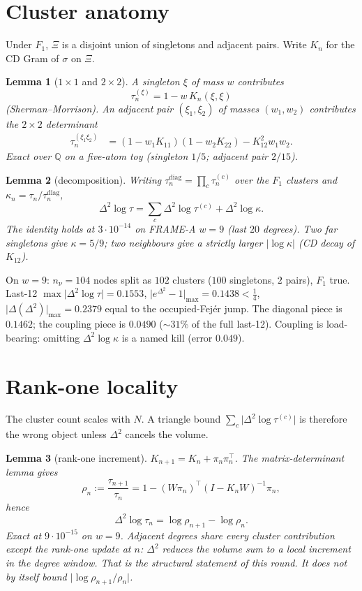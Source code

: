 \documentclass[11pt]{article}
\newtheorem{lemma}{Lemma}
\theoremstyle{remark}
\newcommand{\Q}{\mathbb{Q}}
\begin{document}
\section{Cluster anatomy}\label{sec:cluster}

Under $F_1$, $\Xi$ is a disjoint union of singletons and adjacent
pairs.  Write $K_n$ for the CD Gram of $\sigma$ on $\Xi$.

\begin{lemma}[$1\times1$ and $2\times2$]\label{lem:sm}
A singleton $\xi$ of mass $w$ contributes
\[
\tau_n^{(\xi)}=1-w\,K_n(\xi,\xi)
\]
(Sherman--Morrison).
An adjacent pair $(\xi_1,\xi_2)$ of masses $(w_1,w_2)$ contributes
the $2\times2$ determinant
\begin{align*}
\tau_n^{(\xi_1\xi_2)}
&=
(1-w_1 K_{11})(1-w_2 K_{22})-K_{12}^2 w_1 w_2.
\end{align*}
Exact over $\Q$ on a five-atom toy (singleton $1/5$; adjacent pair
$2/15$).
\end{lemma}

\begin{lemma}[decomposition]\label{lem:decomp}
Writing $\tau_n^{\mathrm{diag}}=\prod_c\tau_n^{(c)}$ over the
$F_1$ clusters and $\kappa_n=\tau_n/\tau_n^{\mathrm{diag}}$,
\[
\Delta^2\log\tau
=
\sum_c\Delta^2\log\tau^{(c)}
+
\Delta^2\log\kappa.
\]
The identity holds at $3\cdot10^{-14}$ on FRAME-A $w=9$
(last $20$ degrees).
Two far singletons give $\kappa=5/9$; two neighbours give a
strictly larger $\lvert\log\kappa\rvert$ (CD decay of $K_{12}$).
\end{lemma}

On $w=9$: $n_\nu=104$ nodes split as $102$ clusters
($100$ singletons, $2$ pairs), $F_1$ true.
Last-12 $\max\lvert\Delta^2\log\tau\rvert=0.1553$,
$\lvert e^{\Delta^2}-1\rvert_{\max}=0.1438<\tfrac14$,
$\lvert\Delta(\Delta^2)\rvert_{\max}=0.2379$ equal to the
occupied-Fej\'er jump.
The diagonal piece is $0.1462$; the coupling piece is $0.0490$
($\sim 31\%$ of the full last-12).
Coupling is load-bearing: omitting $\Delta^2\log\kappa$ is a named
kill (error $0.049$).

\section{Rank-one locality}\label{sec:rank1}

The cluster count scales with $N$.  A triangle bound
$\sum_c\lvert\Delta^2\log\tau^{(c)}\rvert$ is therefore the wrong
object unless $\Delta^2$ cancels the volume.

\begin{lemma}[rank-one increment]\label{lem:rank1}
$K_{n+1}=K_n+\pi_n\pi_n^\top$.  The matrix-determinant lemma gives
\[
\rho_n
:=
\frac{\tau_{n+1}}{\tau_n}
=
1-(W\pi_n)^\top(I-K_n W)^{-1}\pi_n,
\]
hence
\[
\Delta^2\log\tau_n
=
\log\rho_{n+1}-\log\rho_n.
\]
Exact at $9\cdot10^{-15}$ on $w=9$.
Adjacent degrees share every cluster contribution except the
rank-one update at $n$: $\Delta^2$ reduces the volume sum to a
local increment in the degree window.  That is the structural
statement of this round.  It does \emph{not} by itself bound
$\lvert\log\rho_{n+1}/\rho_n\rvert$.
\end{lemma}
\end{document}
